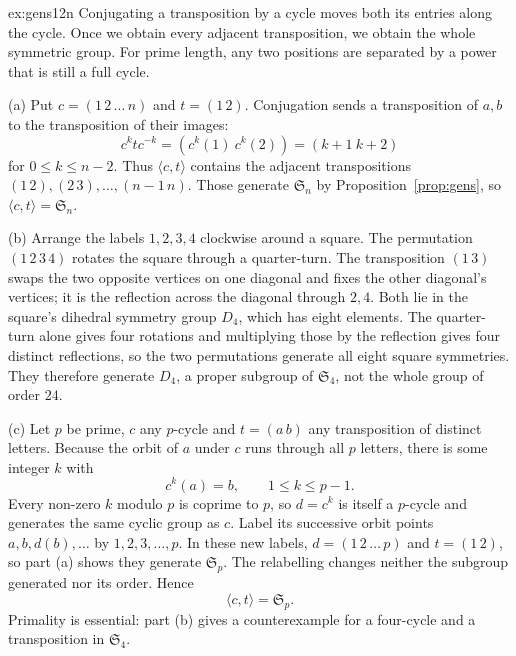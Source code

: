 \begin{solution}{ex:gens12n}
\idea Conjugating a transposition by a cycle moves both its entries along the cycle. Once we obtain every adjacent transposition, we obtain the whole symmetric group. For prime length, any two positions are separated by a power that is still a full cycle.

\writeup (a) Put $c=(1\,2\,\ldots\,n)$ and $t=(1\,2)$. Conjugation sends a transposition of $a,b$ to the transposition of their images:
\[
c^ktc^{-k}=(c^k(1)\ c^k(2))=(k+1\ k+2)
\]
for $0\le k\le n-2$. Thus $\langle c,t\rangle$ contains the adjacent transpositions $(1\,2),(2\,3),\ldots,(n-1\,n)$. Those generate $\mathfrak S_n$ by Proposition~\ref{prop:gens}, so $\langle c,t\rangle=\mathfrak S_n$.

(b) Arrange the labels $1,2,3,4$ clockwise around a square. The permutation $(1\,2\,3\,4)$ rotates the square through a quarter-turn. The transposition $(1\,3)$ swaps the two opposite vertices on one diagonal and fixes the other diagonal's vertices; it is the reflection across the diagonal through $2,4$. Both lie in the square's dihedral symmetry group $D_4$, which has eight elements. The quarter-turn alone gives four rotations and multiplying those by the reflection gives four distinct reflections, so the two permutations generate all eight square symmetries. They therefore generate $D_4$, a proper subgroup of $\mathfrak S_4$, not the whole group of order $24$.

(c) Let $p$ be prime, $c$ any $p$-cycle and $t=(a\,b)$ any transposition of distinct letters. Because the orbit of $a$ under $c$ runs through all $p$ letters, there is some integer $k$ with
\[
c^k(a)=b,\qquad1\le k\le p-1.
\]
Every non-zero $k$ modulo $p$ is coprime to $p$, so $d=c^k$ is itself a $p$-cycle and generates the same cyclic group as $c$. Label its successive orbit points $a,b,d(b),\ldots$ by $1,2,3,\ldots,p$. In these new labels, $d=(1\,2\,\ldots\,p)$ and $t=(1\,2)$, so part (a) shows they generate $\mathfrak S_p$. The relabelling changes neither the subgroup generated nor its order. Hence
\[
\boxed{\langle c,t\rangle=\mathfrak S_p}.
\]
Primality is essential: part (b) gives a counterexample for a four-cycle and a transposition in $\mathfrak S_4$.
\end{solution}

